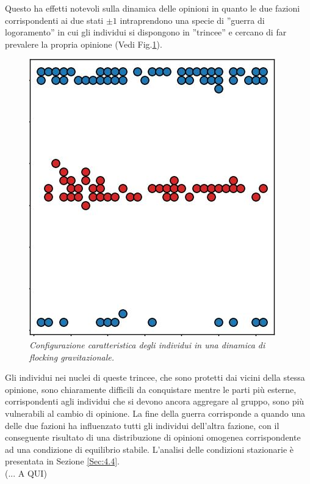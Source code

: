 \documentclass{article}
\begin{document}
Questo ha effetti notevoli sulla dinamica delle opinioni in quanto le due fazioni corrispondenti ai due stati $\pm1$ intraprendono una specie di ''guerra di logoramento'' in cui gli individui si dispongono in ''trincee'' e cercano di far prevalere la propria opinione (Vedi Fig.\ref{Fig:9}). 
\begin{figure}[h]
\centering
\includegraphics{trincea.jpg}
\caption{\textit{Configurazione caratteristica degli individui in una dinamica di flocking gravitazionale.}}
\label{Fig:9}

\end{figure}

Gli individui nei nuclei di queste trincee, che sono protetti dai vicini della stessa opinione, sono chiaramente difficili da conquistare mentre le parti più esterne, corrispondenti agli individui che si devono ancora aggregare al gruppo, sono più vulnerabili al cambio di opinione. La fine della guerra corrisponde a quando una delle due fazioni ha influenzato tutti gli individui dell'altra fazione, con il conseguente risultato di una distribuzione di opinioni omogenea corrispondente ad una condizione di equilibrio stabile. L'analisi delle condizioni stazionarie è presentata in Sezione \ref{Sec:4.4}.
\\ (... A QUI)
\end{document}
